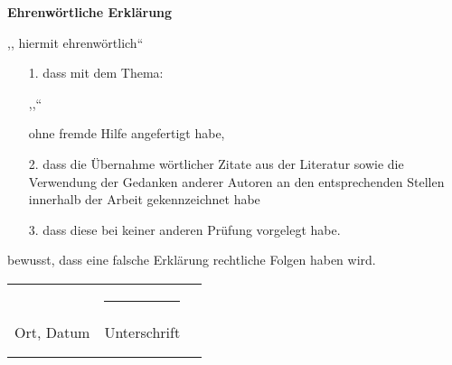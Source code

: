 \thispagestyle{empty}

\begin{center}
    \textbf{\large Ehrenwörtliche Erklärung}
\end{center}
\vspace{0.5cm}

,,\space
hiermit ehrenwörtlich``
\vspace{1cm}
\begin{enumerate}
\item[1.]  
dass \space
\reporttype \space mit dem Thema:

,,\reporttopic``

ohne fremde Hilfe angefertigt habe,

\item[2.] dass\space
{}\space
die Übernahme wörtlicher Zitate aus der Literatur sowie die Verwendung der Gedanken anderer Autoren an den entsprechenden Stellen innerhalb der Arbeit gekennzeichnet habe\space

\item[3.] dass\space
{}\space
diese \reporttype\space bei keiner anderen Prüfung vorgelegt habe.

\end{enumerate}
\vspace{1cm}
\space
bewusst, dass eine falsche Erklärung rechtliche Folgen haben wird.
\vspace{2cm}

\begin{tabular}{p{7cm}p{7cm}l}
    \rpt{\value{authorcount}}{
        \rule{7cm}{0.4pt} & \rule{7cm}{0.4pt} \\
        Ort, Datum & Unterschrift \\
        \vspace{1cm} & \vspace{1cm}	\\
    }
\end{tabular}
